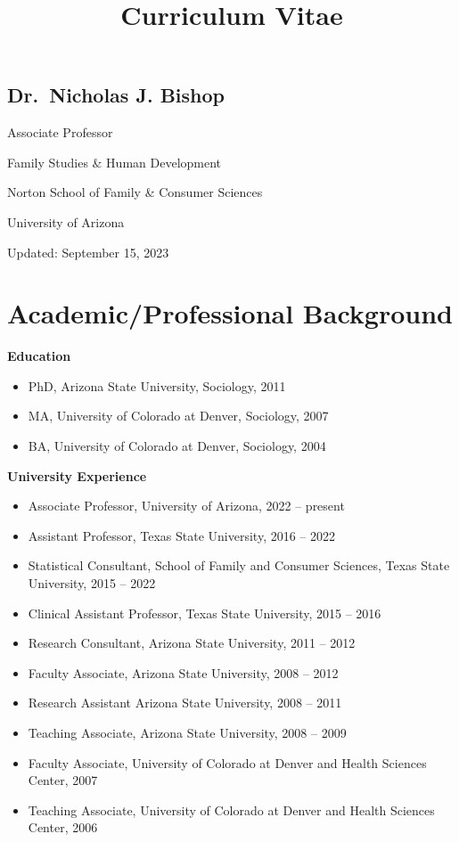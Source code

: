\documentclass[
]{article}
\title{Curriculum Vitae}
\author{}
\date{\vspace{-2.5em}}
\begin{document}
\maketitle

\hypertarget{dr.-nicholas-j.-bishop}{%
\subsection{\texorpdfstring{\textbf{Dr.~Nicholas J.
Bishop}}{Dr.~Nicholas J. Bishop}}\label{dr.-nicholas-j.-bishop}}

Associate Professor

Family Studies \& Human Development

Norton School of Family \& Consumer Sciences

University of Arizona

Updated: September 15, 2023

\hypertarget{academicprofessional-background}{%
\section{\texorpdfstring{\textbf{Academic/Professional
Background}}{Academic/Professional Background}}\label{academicprofessional-background}}

\textbf{Education}

\begin{itemize}
\item
  PhD, Arizona State University, Sociology, 2011
\item
  MA, University of Colorado at Denver, Sociology, 2007
\item
  BA, University of Colorado at Denver, Sociology, 2004
\end{itemize}

\textbf{University Experience}

\begin{itemize}
\item
  Associate Professor, University of Arizona, 2022 -- present
\item
  Assistant Professor, Texas State University, 2016 -- 2022
\item
  Statistical Consultant, School of Family and Consumer Sciences, Texas
  State University, 2015 -- 2022
\item
  Clinical Assistant Professor, Texas State University, 2015 -- 2016
\item
  Research Consultant, Arizona State University, 2011 -- 2012
\item
  Faculty Associate, Arizona State University, 2008 -- 2012
\item
  Research Assistant Arizona State University, 2008 -- 2011
\item
  Teaching Associate, Arizona State University, 2008 -- 2009
\item
  Faculty Associate, University of Colorado at Denver and Health
  Sciences Center, 2007
\item
  Teaching Associate, University of Colorado at Denver and Health
  Sciences Center, 2006
\end{itemize}
\end{document}
